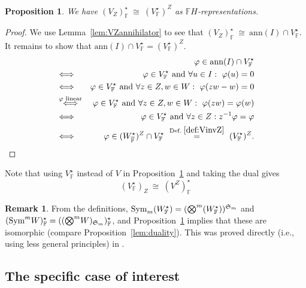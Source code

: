 \documentclass[a4paper]{extarticle}
\newcommand{\aS}{\mathfrak{S}}
\newcommand{\IF}{\mathbb{F}}
\newcommand{\oIF}{{\overline{\mathbb{F}}}}
\newcommand{\tensor}{{\textstyle\bigotimes}}
\newcommand{\Sym}{\textup{Sym}}
\newcommand{\ann}{\mathrm{ann}}
\newcommand{\coinv}{V_Z}
\numberwithin{theorem}{section}
\newtheorem{proposition}[theorem]{Proposition}
\theoremstyle{definition}
\newtheorem{remark/}[theorem]{Remark}
\newenvironment{remark}
  {\renewcommand{\qedsymbol}{\scalebox{0.65}{$\blacksquare$}}
   \pushQED{\qed}\begin{remark/}}
  {\popQED\end{remark/}}
\begin{document}
\begin{proposition}\label{pro:dual}
We have
$(\coinv)^\star_\IF \ \cong \ (V^\star_\IF)^Z$ as $\IF H$-representations.
\end{proposition}
\begin{proof}
We use Lemma~\ref{lem:VZannihilator} to see that $(\coinv)^\star_\IF \ \cong \ \ann(I) \cap V^\star_\IF$.
It remains to show that $\ann(I)\cap V^\star_\IF = (V^\star_\IF)^Z$.
\begin{eqnarray*}
&&
\varphi \in \ann(I)\cap V^\star_\IF
\\
&\Longleftrightarrow&
\varphi\in V^\star_\IF \textup{ and } \forall u\in I: \ \varphi(u)=0
\\
&\Longleftrightarrow&
\varphi\in V^\star_\IF \textup{ and } \forall z\in Z, w\in W: \ \varphi(zw-w)=0
\\
&\stackrel{\varphi\textup{ linear}}{\Longleftrightarrow}&
\varphi\in V^\star_\IF \textup{ and } \forall z\in Z, w\in W: \ \varphi(zw)=\varphi(w)
\\
&\Longleftrightarrow&
\varphi\in V^\star_\IF
\textup{ and } \forall z\in Z: z^{-1}\varphi=\varphi
\\
&\Longleftrightarrow&
\varphi \in (W^\star_\oIF)^Z \cap V^\star_\IF
 \ \stackrel{\textup{Def.~}\ref{def:VinvZ}}{=} \ 
(V^\star_\IF)^Z.
\end{eqnarray*}

\vspace{-0.8cm}
\end{proof}

Note that using $V^\star_\IF$ instead of $V$ in Proposition~\ref{pro:dual} and taking the dual gives
\begin{equation}\label{eq:Vstardual}
(V^\star_\IF)_Z \ \cong \ (V^Z)^\star_\IF
\end{equation}

\begin{remark}
From the definitions, 
$\Sym_m (W^\star_\IF) =(\tensor^m (W^\star_\IF))^{\aS_m}$
and $(\Sym^m W)^\star_\IF = ((\tensor^m W)_{\aS_m})^\star_\IF$, 
and Proposition~\ref{pro:dual} implies that these are isomorphic (compare Proposition~\ref{lem:duality}).
This was proved directly (i.e., using less general principles) in \cite[Prop.~3.7]{McD21}.
\end{remark}

\subsection{The specific case of interest}
\label{subsec:specificcase}
 
\end{document}
